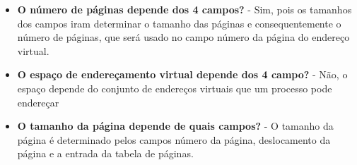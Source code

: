 \begin{question}

    \begin{itemize}
        \item \textbf{O número de páginas depende dos 4 campos?} - Sim, pois os tamanhos dos campos iram
        determinar o tamanho das páginas e consequentemente o número de páginas, que será usado no campo número 
        da página do endereço virtual.
        \item \textbf{O espaço de endereçamento virtual depende dos 4 campo?} - Não, o espaço depende 
        do conjunto de endereços virtuais que um processo pode endereçar
        \item \textbf{O tamanho da página depende de quais campos?} - O tamanho da página 
        é determinado pelos campos número da página, deslocamento da página e a entrada da tabela de 
        páginas.
    \end{itemize}

\end{question}
